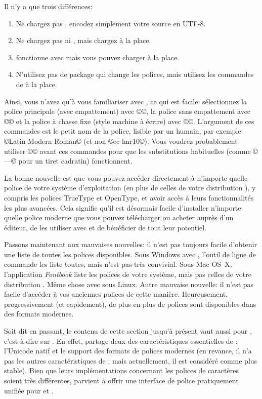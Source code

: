\documentclass{lltxdoc}
\begin{document}
Il n'y a que trois différences:
\begin{enumerate}
  \item Ne chargez pas , encodez simplement votre source en UTF-8.
  \item Ne chargez pas  ni , mais chargez 
     à la place.
  \item {} fonctionne avec \lualatex{} mais vous pouvez charger 
     à la place.
  \item N'utilisez pas de package qui change les polices, mais utilisez les commandes
    de  à la place.
\end{enumerate}
Ainsi, vous n'avez qu'à vous familiariser avec , ce qui est facile:
sélectionnez la police principale (avec empattement) avec ©\setmainfont©,
la police sans empattement avec ©\setsansfont© et la police à chasse fixe
(style machine à écrire) avec ©\setmonofont©. L'argument de ces commandes est
le petit nom de la police, lisible par un humain, par exemple ©Latin Modern Roman©
(et non ©ec-lmr10©). Vous voudrez probablement utiliser ©©
avant ces commandes pour que les substitutions \tex habituelles
(comme ©---© pour un tiret cadratin) fonctionnent.

La bonne nouvelle est que vous pouvez accéder directement à n'importe quelle
police de votre système d'exploitation (en plus de celles de votre distribution \tex),
y compris les polices TrueType et OpenType, et avoir accès à leurs fonctionnalités
les plus avancées. Cela signifie qu'il est désormais facile d'installer n'importe
quelle police moderne que vous pouvez télécharger ou acheter auprès d'un éditeur,
de les utiliser avec \lualatex{} et de bénéficier de tout leur potentiel.

Passons maintenant aux mauvaises nouvelles: il n'est pas toujours facile d'obtenir
une liste de toutes les polices disponibles. Sous Windows avec \texlive, l'outil
de ligne de commande  les liste toutes, mais n'est pas très convivial.
Sous Mac OS~X, l'application \emph{Fontbook} liste les polices de votre système,
mais pas celles de votre distribution \tex. Même chose avec  sous Linux.
Autre mauvaise nouvelle: il n'est pas facile d'accéder à vos anciennes polices
de cette manière. Heureusement, progressivement (et rapidement), de plus en plus
de polices sont disponibles dans des formats modernes.

Soit dit en passant, le contenu de cette section jusqu'à présent vaut aussi pour
\xelatex, c'est-à-dire \latex sur \xetex. En effet, \xetex partage deux des
caractéristiques essentielles de \luatex: l'Unicode natif et le support des formats
de polices modernes (en revance, il n'a pas les autres caractéristiques de \luatex;
mais actuellement, il est considéré comme plus stable). Bien que leurs implémentations
concernant les polices de caractères soient très différentes,  parvient
à offrir une interface de police pratiquement unifiée pour \xelatex et \lualatex.
\end{document}
